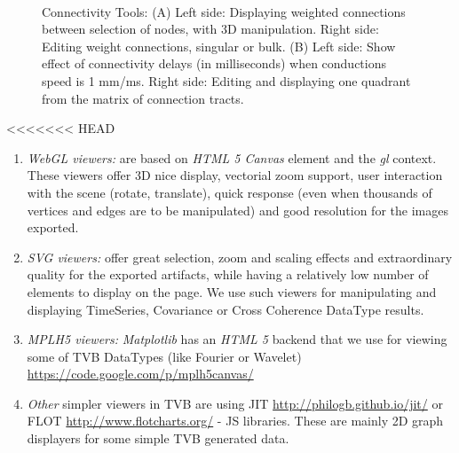  \begin{figure}[!htbp]
    \centering
    \\
    \caption{Connectivity Tools: 
    (A) Left side: Displaying weighted connections between selection of nodes, with 3D manipulation.
    Right side: Editing weight connections, singular or bulk.
    (B) Left side: Show effect of connectivity delays (in milliseconds) when conductions speed is 1 mm/ms.
    Right side: Editing and displaying one quadrant from the matrix of connection tracts.}
        \label{fig:connectivity}
\end{figure}

<<<<<<< HEAD
\begin{enumerate}

	\item \emph{WebGL viewers:} are based on \emph{HTML 5 Canvas} element and the \emph{gl} context. 
	These viewers offer 3D nice display, vectorial zoom support, user interaction with the scene (rotate, translate), quick response 
	(even when thousands of vertices and edges are to be manipulated) and good resolution for the images exported.
	
	\item \emph{SVG viewers:} offer great selection, zoom and scaling effects and extraordinary quality for the exported artifacts, while having 
	a relatively low number of elements to display on the page. 
	We use such viewers for manipulating and displaying TimeSeries, Covariance or Cross Coherence DataType results.
	
	\item \emph{MPLH5 viewers:} \emph{Matplotlib} has an \emph{HTML 5} backend that we use for viewing some of TVB DataTypes (like Fourier or Wavelet)
	\url{https://code.google.com/p/mplh5canvas/}
	
	\item \emph{Other} simpler viewers in TVB are using JIT \url{http://philogb.github.io/jit/} or FLOT \url{http://www.flotcharts.org/} - JS libraries.
	These are mainly 2D graph displayers for some simple TVB generated data.

\end{enumerate}



